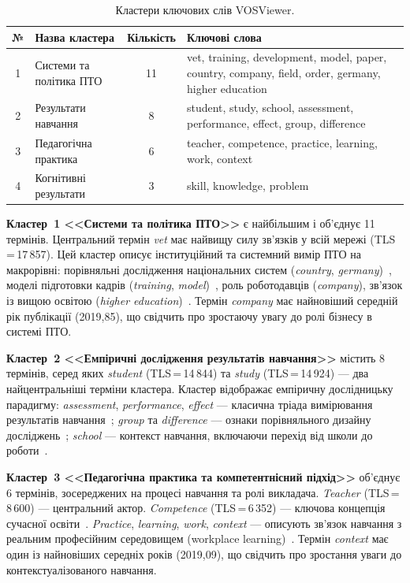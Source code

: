 \begin{table}[htbp]
\centering
\caption{Кластери ключових слів VOSViewer.}
\label{tab:clusters}
\setlength\tabcolsep{3pt}
\begin{tabular}{|c|p{3.5cm}|c|p{8cm}|}
\hline
\textbf{№} & \textbf{Назва кластера} & \textbf{Кількість} & \textbf{Ключові слова} \\
\hline
1 & Системи та політика ПТО & 11 & vet, training, development, model, paper, country, company, field, order, germany, higher education \\
\hline
2 & Результати навчання & 8 & student, study, school, assessment, performance, effect, group, difference \\
\hline
3 & Педагогічна практика & 6 & teacher, competence, practice, learning, work, context \\
\hline
4 & Когнітивні результати & 3 & skill, knowledge, problem \\
\hline
\end{tabular}
\end{table}

\textbf{Кластер~1 <<Системи та політика ПТО>>} є найбільшим і об'єднує 11 термінів. Центральний термін \textit{vet} має найвищу силу зв'язків у всій мережі (TLS\,=\,17\,857). Цей кластер описує інституційний та системний вимір ПТО на макрорівні: порівняльні дослідження національних систем (\textit{country}, \textit{germany})~\cite{Pilz2017, Euler2013}, моделі підготовки кадрів (\textit{training}, \textit{model})~\cite{Busemeyer2012, Bosch2008}, роль роботодавців (\textit{company}), зв'язок із вищою освітою (\textit{higher education})~\cite{Gonon2014}. Термін \textit{company} має найновіший середній рік публікації (2019,85), що свідчить про зростаючу увагу до ролі бізнесу в системі ПТО.

\textbf{Кластер~2 <<Емпіричні дослідження результатів навчання>>} містить 8 термінів, серед яких \textit{student} (TLS\,=\,14\,844) та \textit{study} (TLS\,=\,14\,924) --- два найцентральніші терміни кластера. Кластер відображає емпіричну дослідницьку парадигму: \textit{assessment}, \textit{performance}, \textit{effect} --- класична тріада вимірювання результатів навчання~\cite{Hanushek2017}; \textit{group} та \textit{difference} --- ознаки порівняльного дизайну досліджень~\cite{Eichhorst2015}; \textit{school} --- контекст навчання, включаючи перехід від школи до роботи~\cite{Ryan2001, Aarkrog2005}.

\textbf{Кластер~3 <<Педагогічна практика та компетентнісний підхід>>} об'єднує 6 термінів, зосереджених на процесі навчання та ролі викладача. \textit{Teacher} (TLS\,=\,8\,600) --- центральний актор. \textit{Competence} (TLS\,=\,6\,352) --- ключова концепція сучасної освіти~\cite{Mulder2014}. \textit{Practice}, \textit{learning}, \textit{work}, \textit{context} --- описують зв'язок навчання з реальним професійним середовищем (workplace learning)~\cite{Tynjala2008, Billett2011}. Термін \textit{context} має один із найновіших середніх років (2019,09), що свідчить про зростання уваги до контекстуалізованого навчання.

